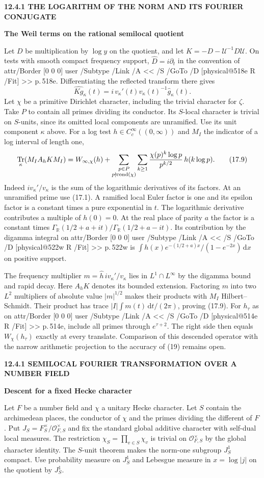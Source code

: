 \documentclass[11pt,letterpaper]{article}
\makeatletter
\newcommand{\rightmarktext}{}
\newcommand{\printfolio}{}
\newcommand{\leaf}[4]{\clearpage\gdef\printfolio{#1}\gdef\rightmarktext{#2}%
  {\small\sffamily\bfseries\color{ink}#3\par}\vspace{3pt}%
  {\LARGE\bfseries #4\par}\vspace{5pt}}
\newcommand{\R}{\mathbb R}
\newcommand{\dd}{\,\mathrm d}
\DeclareMathOperator{\Tr}{Tr}
\newcommand{\MusicPDFPageRef}[1]{\pdfpageref\csname physical@#1\endcsname\space\space 0 R}
\newcommand{\pagelink}[2]{\leavevmode\pdfstartlink attr{/Border [0 0 0]} user{%
  /Subtype /Link /A << /S /GoTo /D [\MusicPDFPageRef{#1} /Fit] >>}%
  {\color{ink}#2}\pdfendlink}
\newcommand{\pg}[1]{\pagelink{#1}{p.\,#1}}
\makeatother
\begin{document}
\leaf{518f}{The conductor operator}{12.4.1 \quad THE LOGARITHM OF THE NORM AND ITS FOURIER CONJUGATE}{The Weil terms on the rational semilocal quotient}
Let $D$ be multiplication by $\log y$ on the quotient, and let
$K=-D-\mathcal U^{-1}D\mathcal U$. On tests with smooth compact
frequency support, $\widehat D=i\partial_t$ in the convention of
\pg{518e}. Differentiating the reflected transform there gives
\[
       \widehat{Kg}_\kappa(t)
           =i\,v_\kappa'(t)v_\kappa(t)^{-1}\widehat g_\kappa(t).
\]
Let $\chi$ be a primitive Dirichlet character, including the trivial
character for $\zeta$. Take $P$ to contain all primes dividing its
conductor. Its $S$-local character is trivial on $S$-units, since its
omitted local components are unramified. Use its unit component
$\kappa$ above. For a log test $h\in C_c^\infty((0,\infty))$ and
$M_I$ the indicator of a log interval of length one,
\[
 \Tr_\kappa(M_I A_h K M_I)=W_{\infty,\chi}(h)+
   \sum_{\substack{p\in P\\p\nmid {\rm cond}(\chi)}}\sum_{k\ge1}
       \frac{\chi(p)^k\log p}{p^{k/2}}\,h(k\log p).
 \tag{17.9}
\]
Indeed $i v_\kappa'/v_\kappa$ is the sum of the logarithmic derivatives
of its factors. At an unramified prime use (17.1). A ramified local
Euler factor is one and its epsilon factor is a constant times a pure
exponential in $t$. The logarithmic derivative contributes a multiple
of $h(0)=0$. At the real place of parity $a$ the factor is a constant
times $\Gamma_\R(1/2+a+it)/\Gamma_\R(1/2+a-it)$.
Its contribution by the digamma integral on \pg{522w} is
$\int h(x)e^{-(1/2+a)x}/(1-e^{-2x})\dd x$ on positive support.

The frequency multiplier $m=\widehat h\,i v_\kappa'/v_\kappa$ lies
in $L^1\cap L^\infty$ by the digamma bound and rapid decay. Here
$A_hK$ denotes its bounded extension. Factoring $m$ into two $L^2$
multipliers of absolute value $|m|^{1/2}$ makes their products with
$M_I$ Hilbert--Schmidt. Their product has trace
$|I|\int m(t)\dd t/(2\pi)$, proving (17.9).
For $h_\tau$ as on \pg{514e}, include all primes through $e^{\tau+2}$.
The right side then equals $W_\chi(h_\tau)$ exactly at every translate.
Comparison of this descended operator with the narrow arithmetic
projection to the accuracy of (19) remains open.

\leaf{518g}{The Hecke component}{12.4.1 \quad SEMILOCAL FOURIER TRANSFORMATION OVER A NUMBER FIELD}{Descent for a fixed Hecke character}
Let $F$ be a number field and $\chi$ a unitary Hecke character. Let
$S$ contain the archimedean places, the conductor of $\chi$ and the
primes dividing the different of $F$. Put
$J_S=F_S^\times/\mathcal O_{F,S}^\times$ and fix the standard global
additive character with self-dual local measures. The restriction
$\chi_S=\prod_{v\in S}\chi_v$ is trivial on $\mathcal O_{F,S}^\times$
by the global character identity. The $S$-unit theorem makes the
norm-one subgroup $J_S^1$ compact. Use probability measure on $J_S^1$
and Lebesgue measure in $x=\log|j|$ on the quotient by $J_S^1$.
\end{document}

